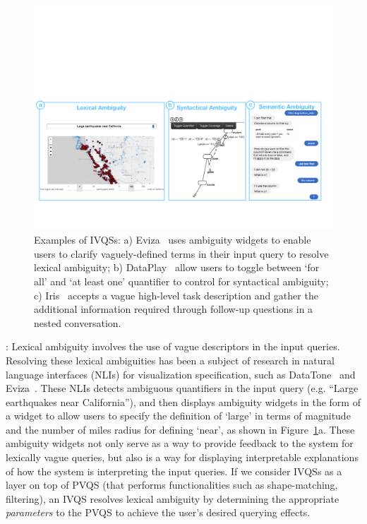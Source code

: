 \begin{figure}[h!]
\centering
\includegraphics[width=\textwidth]{figures/ambiguity.pdf}
\caption{Examples of IVQSs: a) Eviza~\cite{Setlur2016} uses ambiguity widgets to enable users to clarify vaguely-defined terms in their input query to resolve lexical ambiguity; b) DataPlay~\cite{Abouzied2012} allow users to toggle between `for all' and `at least one' quantifier to control for syntactical ambiguity; c) Iris~\cite{Fast2018} accepts a vague high-level task description and gather the additional information required through follow-up questions in a nested conversation.}
\label{fig:ambiguity}
\end{figure}
: Lexical ambiguity involves the use of vague descriptors in the input queries. Resolving these lexical ambiguities has been a subject of research in natural language interfaces (NLIs) for visualization specification, such as DataTone~\cite{Gao2015} and Eviza~\cite{Setlur2016}. These NLIs detects ambiguous quantifiers in the input query (e.g. ``Large earthquakes near California''), and then displays ambiguity widgets in the form of a widget to allow users to specify the definition of `large' in terms of magnitude and the number of miles radius for defining `near', as shown in Figure~\ref{fig:ambiguity}a. These ambiguity widgets not only serve as a way to provide feedback to the system for lexically vague queries, but also is a way for displaying interpretable explanations of how the system is interpreting the input queries. If we consider IVQSs as a layer on top of PVQS (that performs functionalities such as shape-matching, filtering), an IVQS resolves lexical ambiguity by determining the appropriate \textit{parameters} to the PVQS to achieve the user's desired querying effects.
